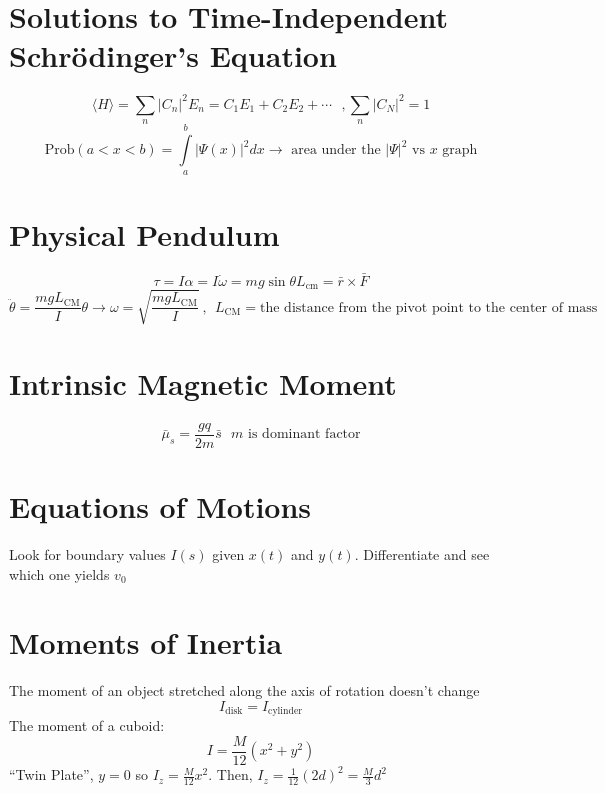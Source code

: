 \documentclass[10pt,a4paper]{article}
\begin{document}
\section{Solutions to Time-Independent Schr\"odinger's Equation} %
\label{sec:solutions_to_time_independent_schr}
\begin{equation}
    \langle H \rangle = \sum \limits_n |C_n|^2 E_n = C_1E_1 + C_2 E_2 + \cdots~~~ ,\sum \limits_n |C_N|^2 = 1
\end{equation}
\begin{equation}
    \textrm{Prob}(a<x<b) = \int \limits_a^b |\Psi(x)|^2dx \rightarrow \textrm{ area under the } |\Psi|^2 \textrm{ vs }x \textrm{ graph}
\end{equation}

\section{Physical Pendulum} %
\label{sec:physical_pendulum}
\begin{equation}
    \tau = I \alpha = I \dot{\omega} = mg\sin \theta L_{\textrm{cm}} = \bar{r} \times \bar{F}
\end{equation}
\begin{equation}
    \ddot{\theta} = \frac{mgL_{\textrm{CM}}}{I}\theta \rightarrow \omega = \sqrt{\frac{mgL_{\textrm{CM}}}{I}}~,~~ L_{\textrm{CM}}= \textrm{the distance from the pivot point to the center of mass}
\end{equation}

\section{Intrinsic Magnetic Moment} %
\label{sec:intrinsic_magnetic_moment}
\begin{equation}
    \bar{\mu}_s = \frac{gq}{2m}\bar{s}~~~m \textrm{ is dominant factor}
\end{equation}

\section{Equations of Motions} %
\label{sec:equations_of_motions}
Look for boundary values $I(s)$ given $x(t)$ and $y(t)$. Differentiate and see which one yields $v_0$

\section{Moments of Inertia} %
\label{sec:moments_of_inertia}
The moment of an object stretched along the axis of rotation doesn't change
\begin{equation}
    I_{\textrm{disk}} = I_{\textrm{cylinder}}
\end{equation}
The moment of a cuboid: 
\begin{equation}
    I = \frac{M}{12}(x^2 + y^2)
\end{equation}
``Twin Plate'', $y=0$ so $I_z = \frac{M}{12}x^2$. Then, $I_z = \frac{1}{12}(2d)^2 = \frac{M}{3}d^2$
\end{document}
